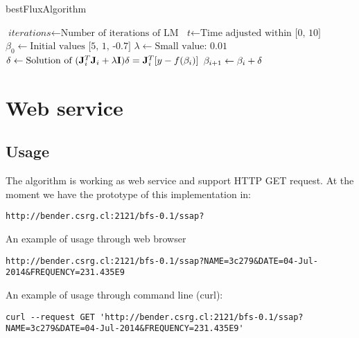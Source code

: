 \documentclass[10pt]{article}
\begin{document}
\begin{algorithm}
\caption{bestFluxAlgorithm}\label{4months}
\begin{algorithmic}[1]
\State $\textit{iterations} \gets \text{Number of iterations of LM}$
\Statex
\State $\textit{t} \gets \text{Time adjusted within [0, 10]}$
\Statex
\State $\textit{$\beta_0$} \gets \text{Initial values [5, 1, -0.7]}$
\Statex
\State $\textit{$\lambda$} \gets \text{Small value: 0.01}$
\Statex
{}
\Statex
\State $\textit{$\delta$} \gets \text{Solution of $ (\mathbf{J}_i^{T}\mathbf{J}_i + \lambda\mathbf{I})\delta = \mathbf{J}_i^{T}[y - f(\beta_i)] $}$
\Statex
\State $\textit{$\beta_{i+1}$} \gets \text{$ \beta_i + \delta $}$
\Statex
\EndFor
\State {}
\EndProcedure
\end{algorithmic}
\end{algorithm}

\section{Web service}
\subsection{Usage}
The algorithm is working as web service and support HTTP GET request. At the moment we have the
prototype of this implementation in:

\begingroup
\fontsize{8pt}{10pt}\selectfont
\begin{verbatim}
http://bender.csrg.cl:2121/bfs-0.1/ssap?
\end{verbatim}
\endgroup

\noindent An example of usage through web browser
\begingroup
\fontsize{8pt}{10pt}\selectfont
\begin{verbatim}
http://bender.csrg.cl:2121/bfs-0.1/ssap?NAME=3c279&DATE=04-Jul-2014&FREQUENCY=231.435E9
\end{verbatim}
\endgroup

\noindent An example of usage through command line (curl):
\begingroup
\fontsize{8pt}{10pt}\selectfont
\begin{verbatim}
curl --request GET 'http://bender.csrg.cl:2121/bfs-0.1/ssap?NAME=3c279&DATE=04-Jul-2014&FREQUENCY=231.435E9'
\end{verbatim}
\endgroup
\end{document}
